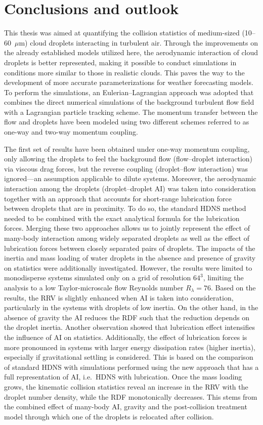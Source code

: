 \documentclass[../thesis.tex]{subfiles}
\begin{document}
\section{Conclusions and outlook\label{sec:con}}
This thesis was aimed at quantifying the collision statistics of medium-sized (10--60~$\mu$m) cloud droplets interacting in turbulent air. Through the improvements on the already established models utilized here, the aerodynamic interaction of cloud droplets is better represented, making it possible to conduct simulations in conditions more similar to those in realistic clouds. This paves the way to the development of more accurate parameterizations for weather forecasting models. To perform the simulations, an Eulerian--Lagrangian approach was adopted that combines the direct numerical simulations of the background turbulent flow field with a Lagrangian particle tracking scheme. The momentum transfer between the flow and droplets have been modeled using two different schemes referred to as one-way and two-way momentum coupling.

The first set of results have been obtained under one-way momentum coupling, only allowing the droplets to feel the background flow (flow--droplet interaction) via viscous drag forces, but the reverse coupling (droplet--flow interaction) was ignored---an assumption applicable to dilute systems. Moreover, the aerodynamic interaction among the droplets (droplet--droplet AI) was taken into consideration together with an approach that accounts for short-range lubrication force between droplets that are in proximity. To do so, the standard HDNS method needed to be combined with the exact analytical formula for the lubrication forces. Merging these two approaches allows us to jointly represent the effect of many-body interaction among widely separated droplets as well as the effect of lubrication forces between closely separated pairs of droplets. The impacts of the inertia and mass loading of water droplets in the absence and presence of gravity on statistics were additionally investigated. However, the results were limited to monodisperse systems simulated only on a grid of resolution $64^3$, limiting the analysis to a low Taylor-microscale flow Reynolds number $R_{\lambda}=76$. Based on the results, the RRV is slightly enhanced when AI is taken into consideration, particularly in the systems with droplets of low inertia. On the other hand, in the absence of gravity the AI reduces the RDF such that the reduction depends on the droplet inertia. Another observation showed that lubrication effect intensifies the influence of AI on statistics. Additionally, the effect of lubrication forces is more pronounced in systems with larger energy dissipation rates (higher inertia), especially if gravitational settling is considered. This is based on the comparison of standard HDNS with simulations performed using the new approach that has a full representation of AI, i.e.\ HDNS with lubrication. Once the mass loading grows, the kinematic collision statistics reveal an increase in the RRV with the droplet number density, while the RDF monotonically decreases. This stems from the combined effect of many-body AI, gravity and the post-collision treatment model through which one of the droplets is relocated after collision.
\end{document}
